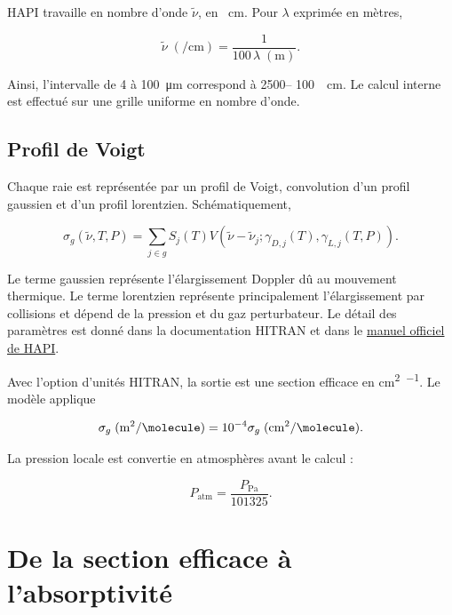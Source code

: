 \documentclass[11pt,a4paper]{article}
\begin{document}
HAPI travaille en nombre d'onde $\widetilde\nu$, en
\si{\per\centi\metre}. Pour $\lambda$ exprimée en mètres,

\begin{equation}
  \widetilde\nu\;(\si{\per\centi\metre})=
  \frac{1}{100\,\lambda\;(\si{\metre})}.
\end{equation}

Ainsi, l'intervalle de 4 à \SI{100}{\micro\metre} correspond à 2500--
\SI{100}{\per\centi\metre}. Le calcul interne est effectué sur une grille
uniforme en nombre d'onde.

\subsection{Profil de Voigt}

Chaque raie est représentée par un profil de Voigt, convolution d'un profil
gaussien et d'un profil lorentzien. Schématiquement,

\begin{equation}
  \sigma_g(\widetilde\nu,T,P)=
  \sum_{j\in g}S_j(T)
  V\!\left(\widetilde\nu-\widetilde\nu_j;
  \gamma_{D,j}(T),\gamma_{L,j}(T,P)\right).
\end{equation}

Le terme gaussien représente l'élargissement Doppler dû au mouvement
thermique. Le terme lorentzien représente principalement l'élargissement par
collisions et dépend de la pression et du gaz perturbateur. Le détail des
paramètres est donné dans la documentation HITRAN et dans le
\href{https://hitran.org/static/hapi/hapi_manual.pdf}{manuel officiel de
HAPI}.

Avec l'option d'unités HITRAN, la sortie est une section efficace en
\si{\centi\metre\squared\per\molecule}. Le modèle applique

\begin{equation}
  \sigma_g\;(\si{\metre\squared\per\molecule})=
  10^{-4}\sigma_g\;(\si{\centi\metre\squared\per\molecule}).
\end{equation}

La pression locale est convertie en atmosphères avant le calcul :

\begin{equation}
  P_{\mathrm{atm}}=\frac{P_{\mathrm{Pa}}}{101325}.
\end{equation}

\section{De la section efficace à l'absorptivité}
\end{document}
